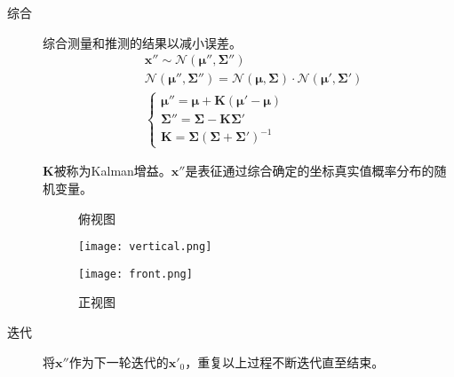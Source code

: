 \begin{description}
	\item[综合]综合测量和推测的结果以减小误差。
	\begin{align}
		&	\bm{x}\bm{''}\sim\mathcal{N}(\bm{\mu}\bm{''},\bm{\Sigma}\bm{''})												\\
		&	\mathcal{N}(\bm{\mu''},\bm{\Sigma''})=\mathcal{N}(\bm{\mu},\bm{\Sigma})\cdot\mathcal{N}(\bm{\mu'},\bm{\Sigma'})		\\
		&
		\begin{cases}
			\bm{\mu''}=\bm{\mu}+\bm{K}(\bm{\mu'}-\bm{\mu})	\\
			\bm{\Sigma''}=\bm{\Sigma}-\bm{K}\bm{\Sigma'}		\\
			\bm{K}=\bm{\Sigma}(\bm{\Sigma}+\bm{\Sigma'})^{-1}
		\end{cases}
	\end{align}
	\par\(\bm{K}\)被称为Kalman增益。\(\bm{x}\bm{''}\)是表征通过综合确定的坐标真实值概率分布的随机变量。
	\begin{figure}[htbp]
		\centering
		\begin{minipage}[htbp]{7.5cm}
			\centering
			\caption{俯视图}
			\texttt{[image: vertical.png]}
		\end{minipage}
		\begin{minipage}[htbp]{7.5cm}
			\centering
			\caption{正视图}
			\texttt{[image: front.png]}
		\end{minipage}
	\end{figure}
	\item[迭代]将\(\bm{x}\bm{''}\)作为下一轮迭代的\(\bm{x}\bm{'}_0\)，重复以上过程不断迭代直至结束。
\end{description}
